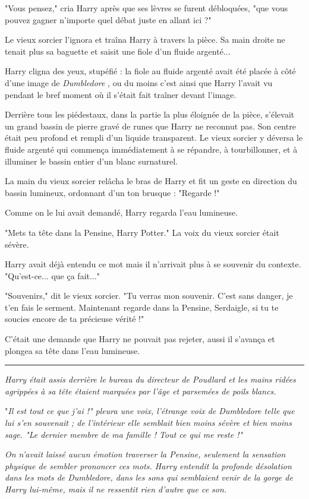 "Vous pensez," cria Harry après que ses lèvres se furent débloquées, "que vous pouvez gagner n'importe quel débat juste en allant ici ?"

Le vieux sorcier l'ignora et traîna Harry à travers la pièce. Sa main droite ne tenait plus sa baguette et saisit une fiole d'un fluide argenté...

Harry cligna des yeux, stupéfié : la fiole au fluide argenté avait été placée à côté d'une image de \emph{Dumbledore} , ou du moins c'est ainsi que Harry l'avait vu pendant le bref moment où il s'était fait traîner devant l'image.

Derrière tous les piédestaux, dans la partie la plus éloignée de la pièce, s'élevait un grand bassin de pierre gravé de runes que Harry ne reconnut pas. Son centre était peu profond et rempli d'un liquide transparent. Le vieux sorcier y déversa le fluide argenté qui commença immédiatement à se répandre, à tourbillonner, et à illuminer le bassin entier d'un blanc surnaturel.

La main du vieux sorcier relâcha le bras de Harry et fit un geste en direction du bassin lumineux, ordonnant d'un ton brusque : "Regarde !"

Comme on le lui avait demandé, Harry regarda l'eau lumineuse.

"Mets ta tête dans la Pensine, Harry Potter." La voix du vieux sorcier était sévère.

Harry avait déjà entendu ce mot mais il n'arrivait plus à se souvenir du contexte. "Qu'est-ce... que ça fait..."

"Souvenirs," dit le vieux sorcier. "Tu verras mon souvenir. C'est sans danger, je t'en fais le serment. Maintenant regarde dans la Pensine, Serdaigle, si tu te soucies encore de ta précieuse vérité !"

C'était une demande que Harry ne pouvait pas rejeter, aussi il s'avança et plongea sa tête dans l'eau lumineuse.
\par\noindent\rule{\textwidth}{0.4pt}
\emph{Harry était assis derrière le bureau du directeur de Poudlard et les mains ridées agrippées à sa tête étaient marquées par l'âge et parsemées de poils blancs.} 

"\emph{Il est tout ce que j'ai !" pleura une voix, l'étrange voix de Dumbledore telle que lui s'en souvenait ; de l'intérieur elle semblait bien moins sévère et bien moins sage. "Le dernier membre de ma famille ! Tout ce qui me reste !"} 

\emph{On n'avait laissé aucun émotion traverser la Pensine, seulement la sensation physique de sembler prononcer ces mots. Harry entendit la profonde désolation dans les mots de Dumbledore, dans les sons qui semblaient venir de la gorge de Harry lui-même, mais il ne ressentit rien d'autre que ce son.} 


